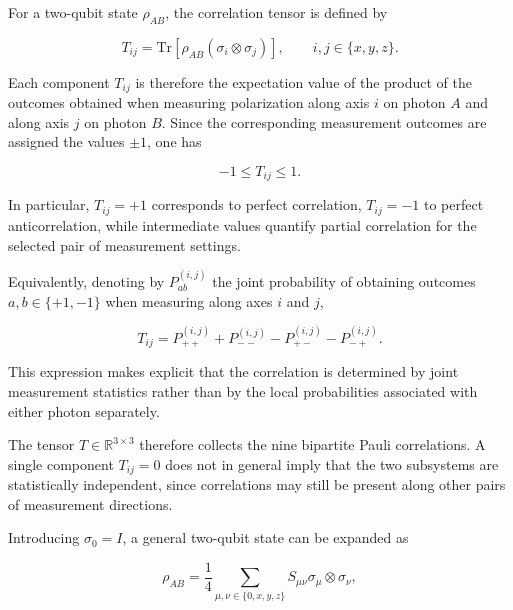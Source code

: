 For a two-qubit state \( \rho_{AB} \), the correlation tensor is defined by

\begin{equation}
T_{ij}
=
\mathrm{Tr}
\left[
\rho_{AB}
\left(
\sigma_i\otimes\sigma_j
\right)
\right],
\qquad
i,j\in\{x,y,z\}.
\label{eq:correlation_tensor_components}
\end{equation}

Each component \(T_{ij}\) is therefore the expectation value of the product of
the outcomes obtained when measuring polarization along axis \(i\) on photon \(A\)
and along axis \(j\) on photon \(B\). Since the corresponding measurement outcomes
are assigned the values \(\pm1\), one has

\begin{equation}
-1
\leq
T_{ij}
\leq
1.
\end{equation}

In particular, \(T_{ij}=+1\) corresponds to perfect correlation,
\(T_{ij}=-1\) to perfect anticorrelation, while intermediate values quantify
partial correlation for the selected pair of measurement settings.

Equivalently, denoting by \(P_{ab}^{(i,j)}\) the joint probability of obtaining
outcomes \(a,b\in\{+1,-1\}\) when measuring along axes \(i\) and \(j\),

\begin{equation}
T_{ij}
=
P_{++}^{(i,j)}
+
P_{--}^{(i,j)}
-
P_{+-}^{(i,j)}
-
P_{-+}^{(i,j)}.
\label{eq:correlation_from_joint_probabilities}
\end{equation}

This expression makes explicit that the correlation is determined by joint
measurement statistics rather than by the local probabilities associated with
either photon separately.

The tensor \(T\in\mathbb{R}^{3\times3}\) therefore collects the nine bipartite
Pauli correlations. A single component \(T_{ij}=0\) does not in general imply that
the two subsystems are statistically independent, since correlations may still be
present along other pairs of measurement directions.

Introducing \( \sigma_0=I \), a general two-qubit state can be expanded as

\begin{equation}
\rho_{AB}
=
\frac{1}{4}
\sum_{\mu,\nu\in\{0,x,y,z\}}
S_{\mu\nu}
\sigma_\mu\otimes\sigma_\nu,
\label{eq:two_qubit_pauli_decomposition}
\end{equation}

